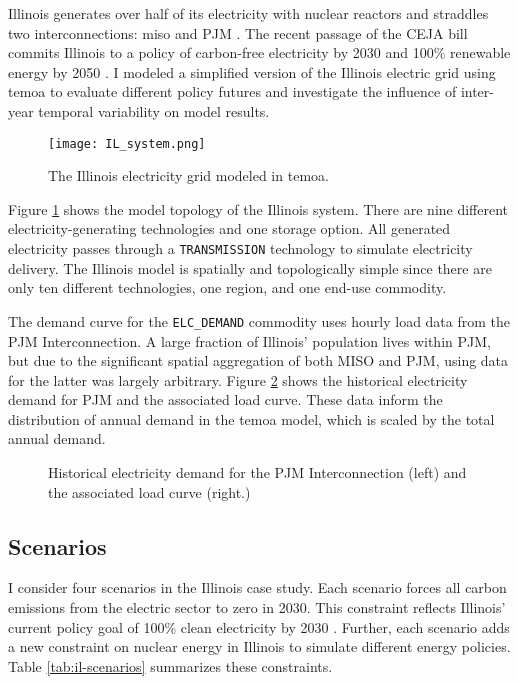 Illinois generates over half of its electricity with nuclear reactors
and straddles two interconnections: \gls{miso} and PJM
\cite{energy_information_administration_eia_nodate}. The recent
passage of the CEJA bill commits Illinois to a policy of carbon-free electricity
by 2030 and 100\% renewable energy by 2050 \cite{harmon_climate_2021}.
I modeled a simplified version of the Illinois electric grid using \gls{temoa}
to evaluate different policy futures and investigate the influence of inter-year
temporal variability on model results.

\begin{figure}[H]
  \centering
  \texttt{[image: IL\_system.png]}
  \caption{The Illinois electricity grid modeled in \gls{temoa}.}
  \label{fig:ilsys}
\end{figure}

Figure \ref{fig:ilsys} shows the model topology of the Illinois system. There
are nine different electricity-generating technologies and one storage option.
All generated electricity passes through a \texttt{TRANSMISSION} technology
to simulate electricity delivery. The Illinois model is spatially and topologically
simple since there are only ten different technologies, one region, and one
end-use commodity.

The demand curve for the \texttt{ELC\_DEMAND} commodity uses hourly load
data from the PJM Interconnection. A large fraction of Illinois' population lives
within PJM, but due to the significant spatial aggregation of both MISO and PJM,
using data for the latter was largely arbitrary. Figure \ref{fig:pjm-elc} shows
the historical electricity demand for PJM and the associated load curve. These
data inform the distribution of annual demand in the \gls{temoa} model, which is
scaled by the total annual demand.

\begin{figure}[H]
  \centering
  \resizebox{\columnwidth}{!}{}
  \caption{Historical electricity demand for the PJM Interconnection (left) and
  the associated load curve (right.)}
  \label{fig:pjm-elc}
\end{figure}

\subsection{Scenarios}
I consider four scenarios in the Illinois case study. Each scenario forces
all carbon emissions from the electric sector to zero in 2030. This constraint
reflects Illinois' current policy goal of 100\% clean electricity by 2030
\cite{office_of_governor_jb_pritzker_gov_2021}.
Further, each scenario adds a new constraint on nuclear energy in Illinois to
simulate different energy policies. Table \ref{tab:il-scenarios} summarizes these
constraints.

